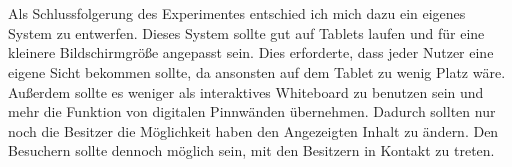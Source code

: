 \\
\\
Als Schlussfolgerung des Experimentes entschied ich mich dazu ein eigenes System zu entwerfen.
Dieses System sollte gut auf Tablets laufen und für eine kleinere Bildschirmgröße angepasst sein. Dies erforderte, dass jeder Nutzer eine eigene Sicht bekommen sollte, da ansonsten auf dem Tablet zu wenig Platz wäre. Außerdem sollte es weniger als interaktives Whiteboard zu benutzen sein und mehr die Funktion von digitalen Pinnwänden übernehmen. Dadurch sollten nur noch die Besitzer die Möglichkeit haben den Angezeigten Inhalt zu ändern. Den Besuchern sollte dennoch möglich sein, mit den Besitzern in Kontakt zu treten.